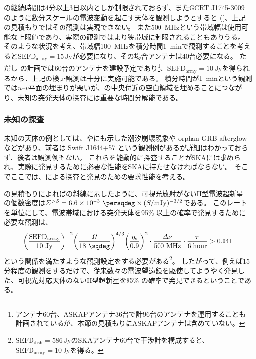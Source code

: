 {\WJN の継続時間は4分以上3日以内としか制限されておらず、またGCRT J1745-3009 のように数分スケールの電波変動を起こす天体を観測しようとすると ()、上記の見積もりではその観測は実現できない。
また500~MHzという帯域幅は使用可能な上限値であり、実際の観測ではより狭帯域に制限されることもありうる。
そのような状況を考え、帯域幅100~MHzを積分時間1~minで観測することを考えると$\text{SEFD}_\text{array}=15~\text{Jy}$が必要になり、その場合アンテナは40台必要になる。
ただし の計画では60台のアンテナを建設予定であり\footnote{アンテナ60台、ASKAPアンテナ36台で計96台のアンテナを運用することも計画されているが、本節の見積もりにASKAPアンテナは含めていない。}、$\text{SEFD}_\text{array}=10~\text{Jy}$を得られるから、上記の検証観測は十分に実施可能である。
積分時間が1~minという観測では$u$--$v$平面の埋まりが悪いが、の中央付近の空白領域を埋めることにつながり、未知の突発天体の探査には重要な時間分解能である。

\subsubsection{未知の探査}


未知の天体の例としては、やにも示した潮汐崩壊現象や orphan GRB afterglow などがあり、前者は Swift J1644+57 という観測例があるが詳細はわかっておらず、後者は観測例もない。
これらを能動的に探査することがSKAには求められ、実際に発見するために必要な性能をSKAに持たせなければならない。
そこでここでは、による探査と発見のための要求性能を考える。


\citet{2012ApJ...747...70F}の見積もりによればの斜線に示したように、可視光放射がないII型電波超新星 \citep{2006ApJ...639..331G} の個数密度は$\varSigma^{>S} = 6.6\times 10^{-3}~\persqdeg \times (S/\text{mJy})^{-3/2}$である。
このレートを単位にして、電波帯域における突発天体を95\% 以上の確率で発見するために必要な観測は、
\begin{align}
	\biggl( \frac{\text{SEFD}_\text{array}}{10~\text{Jy}} \biggr)^{-2}
	\biggl( \frac{\varOmega}{18~\sqdeg} \biggr)^{4/3} 
	\biggl( \frac{\eta_\text{s}}{0.9} \biggr)^2 \cdot 
	\frac{\varDelta \nu}{500~\text{MHz}} \cdot \frac{\tau}{6~\text{hour}}
	> 0.041
	\label{eq:transients.s3.unknowns.SNII}
\end{align}
という関係を満たすような観測設定をする必要がある\footnote{$\text{SEFD}_\text{dish} = 586~\text{Jy}$のSKAアンテナ60台で干渉計を構成すると、$\text{SEFD}_\text{array} = 10~\text{Jy}$を得る。}。
したがって、例えば15分程度の観測をするだけで、従来数々の電波望遠鏡を駆使してようやく発見した、可視光対応天体のないII型超新星を95\% の確率で発見できるということである。

}
